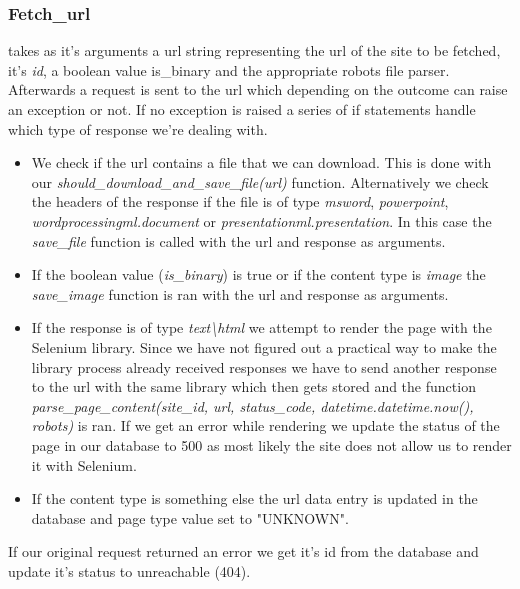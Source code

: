 \documentclass[runningheads]{llncs}
\begin{document}
\subsubsection{Fetch\_url}
takes as it's arguments a url string representing the url of the site to be fetched, it's  \textit{id}, a boolean value is\_binary and the appropriate robots file parser. Afterwards a request is sent to the url which depending on the outcome can raise an exception or not. If no exception is raised a series of if statements handle which type of response we're dealing with. 
\begin{itemize}
  \item We check if the url contains a file that we can download. This is done with our \textit{should\_download\_and\_save\_file(url)} function. Alternatively we check the headers of the response if the file is of type \textit{msword}, \textit{powerpoint}, \textit{wordprocessingml.document} or \textit{presentationml.presentation}. In this case the \textit{save\_file} function is called with the url and response as arguments.
  \item If the boolean value (\textit{is\_binary}) is true or if the content type is \textit{image} the \textit{save\_image} function is ran with the url and response as arguments.
  \item If the response is of type \textit{text\textbackslash html} we attempt to render the page with the Selenium library. Since we have not figured out a practical way to make the library process already received responses we have to send another response to the url with the same library which then gets stored and the function \textit{parse\_page\_content(site\_id, url, status\_code, datetime.datetime.now(), robots)} is ran. If we get an error while rendering we update the status of the page in our database to 500 as most likely the site does not allow us to render it with Selenium.
  \item If the content type is something else the url data entry is updated in the database and page type value set to "UNKNOWN".
\end{itemize}
If our original request returned an error we get it's id from the database and update it's status to unreachable (404).
\end{document}
